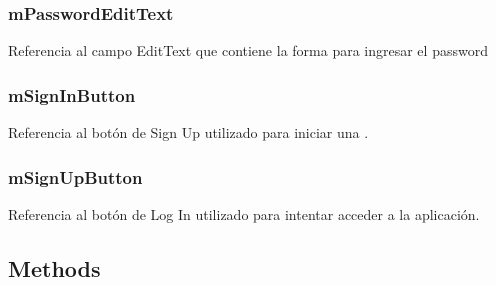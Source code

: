 \documentclass[letterpaper,10pt,english]{sphinxmanual}
\begin{document}
\subsubsection{mPasswordEditText}
\label{Fragments/LogInFragment:mpasswordedittext}

\begin{fulllineitems}
\label{Fragments/LogInFragment:com.fiuba.tallerii.jobify.LogInFragment.mPasswordEditText}
Referencia al campo EditText que contiene la forma para ingresar el password

\end{fulllineitems}



\subsubsection{mSignInButton}
\label{Fragments/LogInFragment:msigninbutton}

\begin{fulllineitems}
\label{Fragments/LogInFragment:com.fiuba.tallerii.jobify.LogInFragment.mSignInButton}
Referencia al botón de Sign Up utilizado para iniciar una .

\end{fulllineitems}



\subsubsection{mSignUpButton}
\label{Fragments/LogInFragment:msignupbutton}

\begin{fulllineitems}
\label{Fragments/LogInFragment:com.fiuba.tallerii.jobify.LogInFragment.mSignUpButton}
Referencia al botón de Log In utilizado para intentar acceder a la aplicación.

\end{fulllineitems}



\subsection{Methods}
\label{Fragments/LogInFragment:methods}
\end{document}
